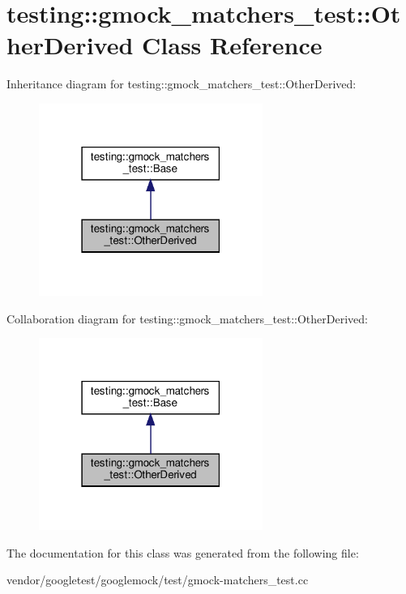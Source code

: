 \hypertarget{classtesting_1_1gmock__matchers__test_1_1_other_derived}{}\section{testing\+:\+:gmock\+\_\+matchers\+\_\+test\+:\+:Other\+Derived Class Reference}
\label{classtesting_1_1gmock__matchers__test_1_1_other_derived}


Inheritance diagram for testing\+:\+:gmock\+\_\+matchers\+\_\+test\+:\+:Other\+Derived\+:
\nopagebreak
\begin{figure}[H]
\begin{center}
\leavevmode
\includegraphics[width=207pt]{classtesting_1_1gmock__matchers__test_1_1_other_derived__inherit__graph}
\end{center}
\end{figure}


Collaboration diagram for testing\+:\+:gmock\+\_\+matchers\+\_\+test\+:\+:Other\+Derived\+:
\nopagebreak
\begin{figure}[H]
\begin{center}
\leavevmode
\includegraphics[width=207pt]{classtesting_1_1gmock__matchers__test_1_1_other_derived__coll__graph}
\end{center}
\end{figure}


The documentation for this class was generated from the following file\+:\begin{DoxyCompactItemize}
\item 
vendor/googletest/googlemock/test/gmock-\/matchers\+\_\+test.\+cc\end{DoxyCompactItemize}
